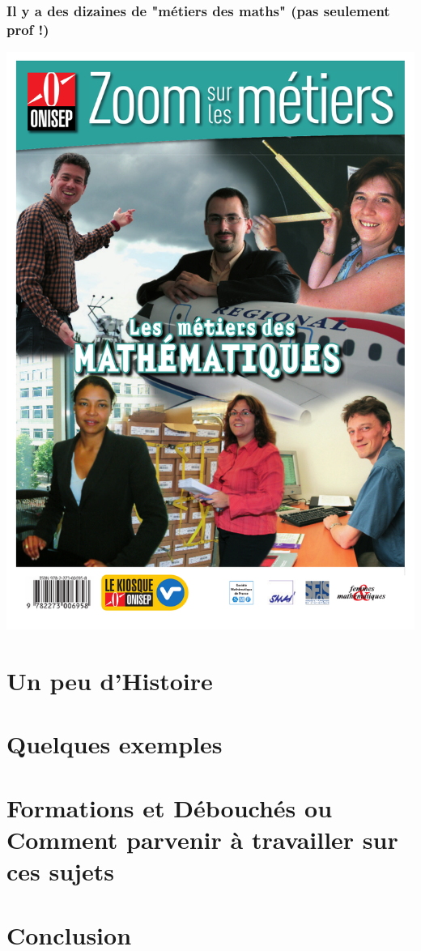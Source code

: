 \documentclass[slideopt,A4]{beamer}
\begin{document}
%
\begin{frame}
\frametitle{Il y a des dizaines de "métiers des maths" {\small (pas seulement prof !) }}
%
\begin{center}
\includegraphics[width=0.4\linewidth]{onisep.pdf}
\end{center}
%
\centerline{}
%
\end{frame}

\section{Un peu d'Histoire}









\section{Quelques exemples}
\label{sec:quelques-exemples}





\section{Formations et Débouchés ou Comment parvenir à travailler sur
  ces sujets}



\section{Conclusion}
\end{document}
